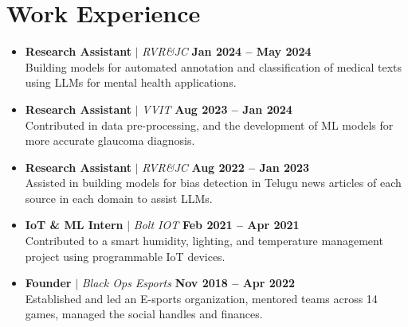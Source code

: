 \documentclass[letterpaper,11pt]{article}
\newcommand{\resumeItem}[1]{\item\small{{#1 \vspace{-2pt}}}}
\newcommand{\resumeSubItem}[1]{\resumeItem{#1}\vspace{-4pt}}
\newcommand{\resumeSubHeadingListStart}{\begin{itemize}[leftmargin=0.0in, label={}]}
\newcommand{\resumeSubHeadingListEnd}{\end{itemize}}
\begin{document}
\section{\textcolor{myColor1}{Work Experience}}
  \resumeSubHeadingListStart
    \resumeSubItem
      {\textbf{\textcolor{myColor2}{Research Assistant}} $|$ \emph{\textcolor{myColor2}{RVR\&JC}} \hfill \textbf{\textcolor{myColor2}{Jan 2024 -- May 2024}}}\vspace{-3pt}\\
      \vspace{10pt} Building models for automated annotation and classification of medical texts using LLMs for mental health applications.\vspace{-5pt}
    \resumeSubItem
      {\textbf{\textcolor{myColor2}{Research Assistant}} $|$ \emph{\textcolor{myColor2}{VVIT}} \hfill \textbf{\textcolor{myColor2}{Aug 2023 -- Jan 2024}}}\vspace{-3pt}\\
      \vspace{10pt} Contributed in data pre-processing, and the development of ML models for more accurate glaucoma diagnosis.\vspace{-5pt}
    \resumeSubItem
      {\textbf{\textcolor{myColor2}{Research Assistant}} $|$ \emph{\textcolor{myColor2}{RVR\&JC}} \hfill \textbf{\textcolor{myColor2}{Aug 2022 -- Jan 2023}}}\vspace{-3pt}\\
      \vspace{10pt} Assisted in building models for bias detection in Telugu news articles of each source in each domain to assist LLMs.\vspace{-5pt}
    \resumeSubItem
      {\textbf{\textcolor{myColor2}{IoT \& ML Intern}} $|$ \emph{\textcolor{myColor2}{Bolt IOT}} \hfill \textbf{\textcolor{myColor2}{Feb 2021 -- Apr 2021}}}\vspace{-5pt}\\
      \vspace{10pt} Contributed to a smart humidity, lighting, and temperature management project using programmable IoT devices.\vspace{-5pt}
    \resumeSubItem
      {\textbf{\textcolor{myColor2}{Founder}} $|$ \emph{\textcolor{myColor2}{Black Ops Esports}} \hfill \textbf{\textcolor{myColor2}{Nov 2018 -- Apr 2022}}}\vspace{-5pt}\\
      \vspace{10pt} Established and led an E-sports organization, mentored teams across 14 games, managed the social handles and finances.\vspace{-10pt}
  \resumeSubHeadingListEnd 
\end{document}
